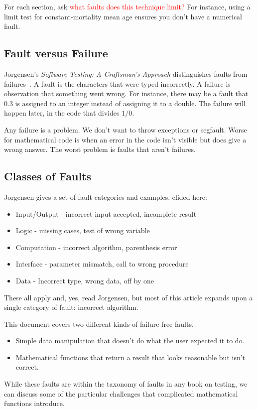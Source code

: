 \documentclass[fleqn,10pt]{olplainarticle}
\newcommand{\aside}[1]{\textcolor{red}{#1}}
\begin{document}
For each section, ask \aside{what faults does this technique limit?}
For instance, using a limit test for constant-mortality mean age
ensures you don't have a numerical fault.

\subsection{Fault versus Failure}
Jorgensen's \emph{Software Testing: A Craftsman's Approach} distinguishes
faults from failures~\citep{jorgensen2013}.
A fault is the characters that were typed
incorrectly. A failure is observation that something went wrong.
For instance, there may be a fault that 0.3 is assigned to an integer
instead of assigning it to a double. The failure will happen later,
in the code that divides $1 / 0$.

Any failure is a problem. We don't want to throw exceptions or segfault.
Worse for mathematical code is when an error in the code isn't visible
but does give a wrong answer.
The worst problem is faults that aren't failures.


\subsection{Classes of Faults}
Jorgensen gives a set of fault categories and examples, elided here:
\begin{itemize}
    \item Input/Output - incorrect input accepted, incomplete result
    \item Logic - missing cases, test of wrong variable
    \item Computation - incorrect algorithm, parenthesis error
    \item Interface - parameter mismatch, call to wrong procedure
    \item Data - Incorrect type, wrong data, off by one
\end{itemize}
These all apply and, yes, read Jorgensen, but most of this article 
expands upon a single category of fault: incorrect algorithm.

This document covers two different kinds of failure-free faults.
\begin{itemize}
\item Simple data manipulation that doesn't do what the user
   expected it to do.
   
\item Mathematical functions that return a result that looks
   reasonable but isn't correct.
\end{itemize}
While these faults are within the taxonomy of faults
in any book on testing, we can discuss some of the particular
challenges that complicated mathematical functions introduce.


\end{document}
